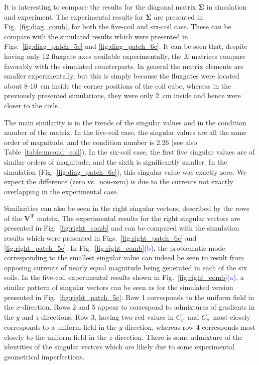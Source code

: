 It is interesting to compare the results for the diagonal matrix
$\bm{\Sigma}$ in simulation and experiment.  The experimental results
for $\bm{\Sigma}$ are presented in Fig.~\ref{fig:diag_comb}, for both
the five-coil and six-coil case.  These can be compare with the
simulated results which were presented in
Figs.~\ref{fig:diag_patch_5c} and \ref{fig:diag_patch_6c}.  It can be
seen that, despite having only 12 fluxgate axes available
experimentally, the $\Sigma$ matrices compare favorably with the
simulated counterparts.  In general the matrix elements are smaller
experimentally, but this is simply because the fluxgates were located
about 8-10~cm inside the corner positions of the coil cube, whereas in
the previously presented simulations, they were only 2~cm inside and
hence were closer to the coils.

The main similarity is in the trends of the singular values and in the
condition number of the matrix.  In the five-coil case, the singular
values are all the same order of magnitude, and the condition number
is 2.26 (see also Table~\ref{table:mcond_coil}).  In the six-coil
case, the first five singular values are of similar orders of
magnitude, and the sixth is significantly smaller.  In the simulation
(Fig.~\ref{fig:diag_patch_6c}), this singular value was exactly zero.
We expect the difference (zero vs.~non-zero) is due to the currents
not exactly overlapping in the experimental case.


Similarities can also be seen in the right singular vectors, described
by the rows of the $\bm{V^T}$ matrix.  The experimental results for
the right singular vectors are presented in Fig.~\ref{fig:right_comb}
and can be compared with the simulation results which were presented
in Figs.~\ref{fig:right_patch_6c} and \ref{fig:right_patch_5c}.  In
Fig.~\ref{fig:right_comb}\textcolor{blue}{(b)}, the problematic mode
corresponding to the smallest singular value can indeed be seen to
result from opposing currents of nearly equal magnitude being
generated in each of the six coils.  In the five-coil experimental
results shown in Fig.~\ref{fig:right_comb}\textcolor{blue}{(a)}, a similar pattern of singular vectors
can be seen as for the simulated version presented in
Fig.~\ref{fig:right_patch_5c}.  Row 1 corresponds to the uniform field
in the $x$-direction.  Rows 2 and 5 appear to correspond to admixtures
of gradients in the $y$ and $z$ directions.  Row 3, having two red
values in $C_y^+$ and $C_y^-$ most closely corresponds to a uniform
field in the $y$-direction, whereas row 4 corresponds most closely to
the uniform field in the $z$-direction.  There is some admixture of
the identities of the singular vectors which are likely due to some
experimental geometrical imperfections.



